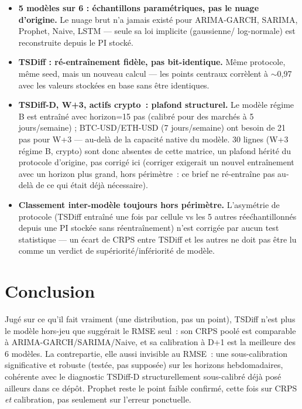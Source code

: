 \documentclass[11pt]{article}
\begin{document}
\begin{itemize}
  \item \textbf{5 mod\`eles sur 6 : \'echantillons param\'etriques, pas le nuage
        d'origine.} Le nuage brut n'a jamais exist\'e pour ARIMA-GARCH,
        SARIMA, Prophet, Naive, LSTM --- seule sa loi implicite (gaussienne/
        log-normale) est reconstruite depuis le PI stock\'e.
  \item \textbf{TSDiff : r\'e-entra\^inement fid\`ele, pas bit-identique.}
        M\^eme protocole, m\^eme seed, mais un nouveau calcul --- les points
        centraux corr\`elent \`a $\sim$0,97 avec les valeurs stock\'ees en
        base sans \^etre identiques.
  \item \textbf{TSDiff-D, W+3, actifs crypto~: plafond structurel.} Le mod\`ele
        r\'egime B est entra\^in\'e avec horizon=15 pas (calibr\'e pour des
        march\'es \`a 5 jours/semaine) ; BTC-USD/ETH-USD (7 jours/semaine)
        ont besoin de 21 pas pour W+3 --- au-del\`a de la capacit\'e native du
        mod\`ele. 30 lignes (W+3 r\'egime B, crypto) sont donc absentes de
        cette matrice, un plafond h\'erit\'e du protocole d'origine, pas
        corrig\'e ici (corriger exigerait un nouvel entra\^inement avec un
        horizon plus grand, hors p\'erim\`etre~: ce brief ne r\'e-entra\^ine
        pas au-del\`a de ce qui \'etait d\'ej\`a n\'ecessaire).
  \item \textbf{Classement inter-mod\`ele toujours hors p\'erim\`etre.}
        L'asymétrie de protocole (TSDiff entra\^in\'e une fois par cellule vs
        les 5 autres r\'ee\'chantillonn\'es depuis une PI stock\'ee sans
        r\'eentra\^inement) n'est corrig\'ee par aucun test statistique --- un
        \'ecart de CRPS entre TSDiff et les autres ne doit pas \^etre lu comme
        un verdict de sup\'eriorit\'e/inf\'eriorit\'e de mod\`ele.
\end{itemize}

\section{Conclusion}

Jug\'e sur ce qu'il fait vraiment (une distribution, pas un point), TSDiff
n'est plus le mod\`ele hors-jeu que sugg\'erait le RMSE seul~: son CRPS pool\'e
est comparable \`a ARIMA-GARCH/SARIMA/Naive, et sa calibration \`a D+1 est la
meilleure des 6 mod\`eles. La contrepartie, elle aussi invisible au RMSE~: une
sous-calibration significative et robuste (test\'ee, pas suppos\'ee) sur les
horizons hebdomadaires, coh\'erente avec le diagnostic \guillemotleft{}TSDiff-D
structurellement sous-calibr\'e\guillemotright{} d\'ej\`a pos\'e ailleurs dans
ce d\'ep\^ot. Prophet reste le point faible confirm\'e, cette fois sur CRPS
\emph{et} calibration, pas seulement sur l'erreur ponctuelle.
\end{document}
